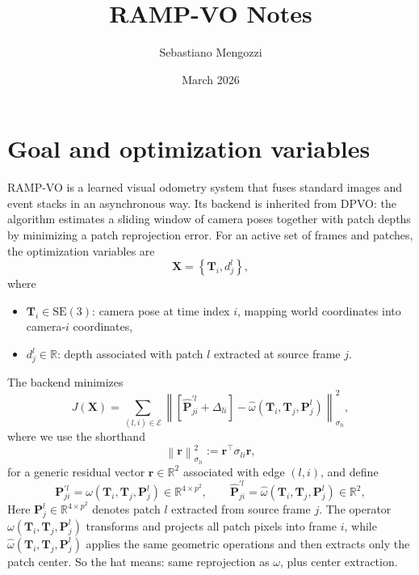 \documentclass[11pt]{article}
\title{RAMP-VO Notes}
\author{Sebastiano Mengozzi}
\date{March 2026}
\newcommand{\R}{\mathbb{R}}
\newcommand{\norm}[1]{\left\lVert #1 \right\rVert}
\newcommand{\T}{^{\top}}
\begin{document}
\maketitle

\section{Goal and optimization variables}

RAMP-VO is a learned visual odometry system that fuses standard images and event stacks in an asynchronous way.
Its backend is inherited from DPVO: the algorithm estimates a sliding window of camera poses together with patch depths by minimizing a patch reprojection error.
For an active set of frames and patches, the optimization variables are
\begin{equation}
\mathbf{X} = \left\{ \mathbf{T}_i, d_j^l \right\},
\end{equation}
where
\begin{itemize}
    \item \(\mathbf{T}_i \in \mathrm{SE}(3)\): camera pose at time index \(i\), mapping world coordinates into camera-\(i\) coordinates,
    \item \(d_j^l \in \R\): depth associated with patch \(l\) extracted at source frame \(j\).
\end{itemize}
The backend minimizes
\begin{equation}
\label{eq:main_ba}
J(\mathbf{X}) = \sum_{(l,i)\in \mathcal{E}} \norm{\left[\hat{\mathbf{P}}_{ji}^{\prime l} + \Delta_{li}\right] - \hat{\omega}(\mathbf{T}_i,\mathbf{T}_j,\mathbf{P}_j^l)}_{\sigma_{li}}^2,
\end{equation}
where we use the shorthand
\begin{equation}
\norm{\mathbf{r}}_{\sigma_{li}}^2 := \mathbf{r}\T \sigma_{li}\mathbf{r},
\end{equation}
for a generic residual vector \(\mathbf{r}\in\R^2\) associated with edge \((l,i)\),
and define
\begin{equation}
\mathbf{P}_{ji}^{\prime l} = \omega(\mathbf{T}_i,\mathbf{T}_j,\mathbf{P}_j^l)\in\R^{4\times p^2},
\qquad
\hat{\mathbf{P}}_{ji}^{\prime l} = \hat{\omega}(\mathbf{T}_i,\mathbf{T}_j,\mathbf{P}_j^l)\in\R^{2},
\end{equation}
Here \(\mathbf{P}_j^l\in\R^{4\times p^2}\) denotes patch \(l\) extracted from source frame \(j\). The operator \(\omega(\mathbf{T}_i,\mathbf{T}_j,\mathbf{P}_j^l)\) transforms and projects all patch pixels into frame \(i\), while \(\hat{\omega}(\mathbf{T}_i,\mathbf{T}_j,\mathbf{P}_j^l)\) applies the same geometric operations and then extracts only the patch center. So the hat means: same reprojection as \(\omega\), plus center extraction.
\end{document}
